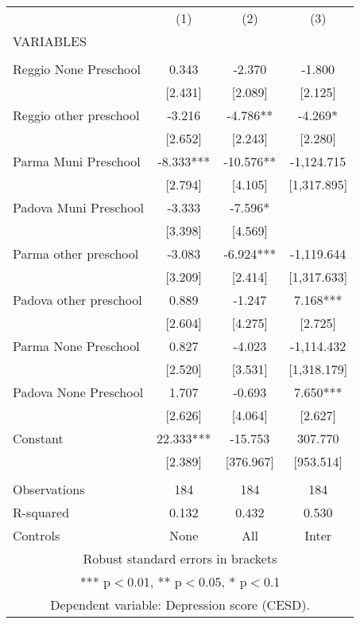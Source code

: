 \begin{tabular}{lccc} \hline
 & (1) & (2) & (3) \\
VARIABLES &  &  &  \\ \hline
 &  &  &  \\
Reggio None Preschool & 0.343 & -2.370 & -1.800 \\
 & [2.431] & [2.089] & [2.125] \\
Reggio other preschool & -3.216 & -4.786** & -4.269* \\
 & [2.652] & [2.243] & [2.280] \\
Parma Muni Preschool & -8.333*** & -10.576** & -1,124.715 \\
 & [2.794] & [4.105] & [1,317.895] \\
Padova Muni Preschool & -3.333 & -7.596* &  \\
 & [3.398] & [4.569] &  \\
Parma other preschool & -3.083 & -6.924*** & -1,119.644 \\
 & [3.209] & [2.414] & [1,317.633] \\
Padova other preschool & 0.889 & -1.247 & 7.168*** \\
 & [2.604] & [4.275] & [2.725] \\
Parma None Preschool & 0.827 & -4.023 & -1,114.432 \\
 & [2.520] & [3.531] & [1,318.179] \\
Padova None Preschool & 1.707 & -0.693 & 7.650*** \\
 & [2.626] & [4.064] & [2.627] \\
Constant & 22.333*** & -15.753 & 307.770 \\
 & [2.389] & [376.967] & [953.514] \\
 &  &  &  \\
Observations & 184 & 184 & 184 \\
R-squared & 0.132 & 0.432 & 0.530 \\
 Controls & None & All & Inter \\ \hline
\multicolumn{4}{c}{ Robust standard errors in brackets} \\
\multicolumn{4}{c}{ *** p$<$0.01, ** p$<$0.05, * p$<$0.1} \\
\multicolumn{4}{c}{ Dependent variable: Depression score (CESD).} \\
\end{tabular}
